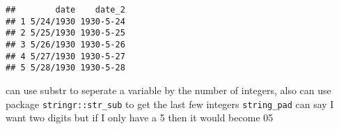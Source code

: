 \documentclass[]{article}
\newenvironment{Shaded}{\begin{snugshade}}{\end{snugshade}}
\newcommand{\DataTypeTok}[1]{\textcolor[rgb]{0.13,0.29,0.53}{#1}}
\newcommand{\DecValTok}[1]{\textcolor[rgb]{0.00,0.00,0.81}{#1}}
\newcommand{\KeywordTok}[1]{\textcolor[rgb]{0.13,0.29,0.53}{\textbf{#1}}}
\newcommand{\NormalTok}[1]{#1}
\newcommand{\OperatorTok}[1]{\textcolor[rgb]{0.81,0.36,0.00}{\textbf{#1}}}
\newcommand{\OtherTok}[1]{\textcolor[rgb]{0.56,0.35,0.01}{#1}}
\newcommand{\StringTok}[1]{\textcolor[rgb]{0.31,0.60,0.02}{#1}}
\begin{document}
\begin{Shaded}
\end{Shaded}

\begin{verbatim}
##        date    date_2
## 1 5/24/1930 1930-5-24
## 2 5/25/1930 1930-5-25
## 3 5/26/1930 1930-5-26
## 4 5/27/1930 1930-5-27
## 5 5/28/1930 1930-5-28
\end{verbatim}

can use substr to seperate a variable by the number of integers, also
can use package \texttt{stringr::str\_sub} to get the last few integers
\texttt{string\_pad} can say I want two digits but if I only have a 5
then it would become 05
\end{document}
